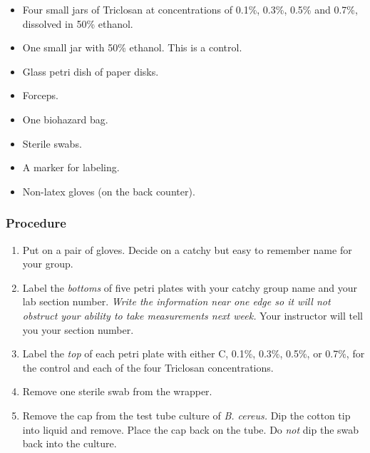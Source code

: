 \documentclass[12pt]{exam}
\begin{document}
\begin{questions}
\begin{itemize}
	\item Four small jars of Triclosan at concentrations of 0.1\%, 0.3\%, 0.5\% and 0.7\%, dissolved in 50\% ethanol.%
	
	\item One small jar with 50\% ethanol. This is a control.

	\item Glass petri dish of paper disks.
	
	\item Forceps.
	
	\item One biohazard bag.
	
	\item Sterile swabs.
	
	\item A marker for labeling.
	
	\item Non-latex gloves (on the back counter).
	
\end{itemize}

\subsubsection*{Procedure}

	\begin{enumerate}
	
		\item Put on a pair of gloves. Decide on a catchy but easy to remember name for your group.  
			
		\item Label the \emph{bottoms} of five petri plates with your catchy group name and your lab section number. \emph{Write the information near one edge so it will not obstruct your ability to take measurements next week.} Your instructor will tell you your section number.
		
		\item Label the \emph{top} of each petri plate with either C, 0.1\%, 0.3\%, 0.5\%, or 0.7\%, for the control and each of the four Triclosan concentrations. 
		
		\item \label{swab_first} Remove one sterile swab from the wrapper. 
		
		\item Remove the cap from the test tube culture of \textit{B. cereus.} Dip the cotton tip into liquid and remove. Place the cap back on the tube. Do \emph{not} dip the swab back into the culture.
		

\end{enumerate}
\end{questions}
\end{document}
